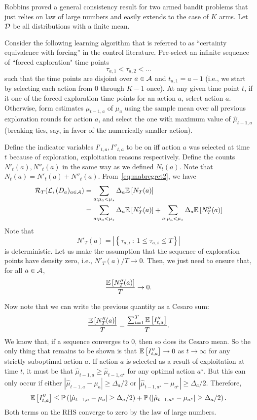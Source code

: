 \documentclass[11pt]{article}
\begin{document}
Robbins \cite{robbins1952some} proved a general consistency result for two armed bandit problems that just relies on law of large numbers and easily extends to the case of $K$ arms.
Let $\mathcal{D}$ be all distributions with a finite mean.

Consider the following learning algorithm that is referred to as ``certainty equivalence with forcing'' in the control literature. Pre-select an infinite sequence of ``forced exploration" time points
\[
\tau_{a,1} < \tau_{a,2} < \ldots
\]
such that the time points are disjoint over $a \in \mathcal{A}$ and $t_{a,1} = a-1$ (i.e., we start by selecting each action from $0$ through $K-1$ once). At any given time point $t$, if it one
of the forced exploration time points for an action $a$, select action $a$. Otherwise, form estimates $\hat{\mu}_{t-1,a}$ of $\mu_a$ using the sample mean over all previous exploration rounds for action $a$, and select the
one with maximum value of $\hat{\mu}_{t-1,a}$ (breaking ties, say, in favor of the numerically smaller action).

Define the indicator variables $I'_{t,a}, I''_{t,a}$ to be on iff action $a$ was selected at time $t$ because of exploration, exploitation reasons respectively. Define the counts $N'_t(a), N''_t(a)$ in the same way as we defined
$N_t(a)$. Note that $N_t(a) = N'_t(a) + N''_t(a)$. From~\eqref{eq:mabregret2}, we have
\begin{align*}
\mathcal{R}_T(\mathcal{L}, (D_a)_{a \in \mathcal{A}}) &= \sum_{a: \mu_a < \mu_\star} \Delta_a \mathbb{E}\left[ N_T(a) \right] \\
&= \sum_{a: \mu_a < \mu_\star} \Delta_a \mathbb{E}\left[ N'_T(a) \right] + \sum_{a: \mu_a < \mu_\star} \Delta_a \mathbb{E}\left[ N''_T(a) \right] 
\end{align*}
Note that
\[
N'_T(a) = |\left\{ \tau_{a,i} \::\: 1 \le \tau_{a,i} \le T \right\}|
\]
is deterministic. Let us make the assumption that the sequence of exploration points have density zero, i.e., $N'_T(a)/T \to 0$. Then, we just need to ensure that, for all $a \in \mathcal{A}$,
\[
\frac{ \mathbb{E}\left[ N''_T(a) \right] }{T} \to 0 .
\]

Now note that we can write the previous quantity as a Cesaro sum:
\[
\frac{ \mathbb{E}\left[ N''_T(a) \right] }{T} = \frac{\sum_{t=1}^T \mathbb{E}\left[ I''_{t,a} \right]} {T} .
\]
We know that, if a sequence converges to $0$, then so does its Cesaro mean. So the only thing that remains to be shown is that $\mathbb{E}\left[ I''_{t,a} \right] \to 0$ as $t \to \infty$ for any 
strictly suboptimal action $a$. If action $a$ is selected as a result of exploitation at time $t$, it must be that $\hat{\mu}_{t-1,a} \ge \hat{\mu}_{t-1,a^\star}$ for any optimal
action $a^\star$. But this can only occur if either $|\hat{\mu}_{t-1,a} - \mu_a| \ge \Delta_a/2$ or $|\hat{\mu}_{t-1,a^\star} - \mu_{a^\star}| \ge \Delta_a/2$. Therefore,
\[
\mathbb{E}\left[ I''_{t,a} \right] \le \mathbb{P}\left( |\hat{\mu}_{t-1,a} - \mu_a| \ge \Delta_a/2 \right) + \mathbb{P}\left( |\hat{\mu}_{t-1,a^\star} - \mu_{a^\star}| \ge \Delta_a/2 \right) .
\]
Both terms on the RHS converge to zero by the law of large numbers.


\end{document}
